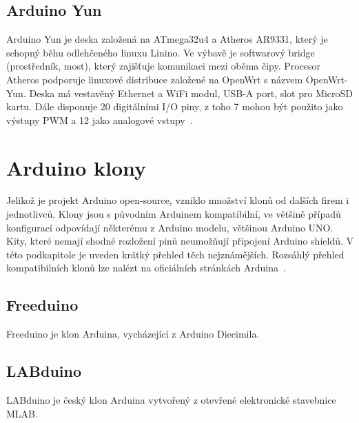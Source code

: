 	
	\subsection{Arduino Yun} 
	Arduino Yun je deska založená na ATmega32u4 a Atheros AR9331, který je schopný běhu odlehčeného linuxu Linino. Ve výbavě je softwarový bridge (prostředník, most), který zajišťuje komunikaci mezi oběma čipy. Procesor Atheros podporuje linuxové distribuce založené na OpenWrt s názvem OpenWrt-Yun. Deska má vestavěný Ethernet a WiFi modul, USB-A port, slot pro MicroSD kartu. Dále disponuje 20 digitálními I/O piny, z toho 7 mohou být použito jako výstupy PWM a 12 jako analogové vstupy~\cite{ArduinoYun}.	


	

\section{Arduino klony}
\label{KapArduinoKlony}

	Jelikož je projekt Arduino open-source, vzniklo množství klonů od dalších firem i jednotlivců. Klony jsou s původním Arduinem kompatibilní, ve většině případů konfigurací odpovídají některému z Arduino modelu, většinou Arduino UNO. Kity, které nemají shodné rozložení pinů neumožňují připojení Arduino shieldů. V této podkapitole je uveden krátký přehled těch nejznámějších. Rozsáhlý přehled kompatibilních klonů lze nalézt na oficiálních stránkách Arduina~\cite{ArduinoClonesWeb}.
	
	\subsection{Freeduino} 
	Freeduino je klon Arduina, vycházející z Arduino Diecimila.
	
	\subsection{LABduino} 
	LABduino je český klon Arduina vytvořený z otevřené elektronické stavebnice MLAB.
	
